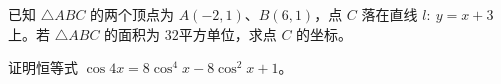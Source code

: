 \documentclass[12pt,a4paper]{exam-zh}
\newcommand{\qscore}[1]{%
    \unskip\nobreak\hfill
    \makebox[0pt][l]{\makebox[4em][r]{(#1\%)}}%
}
\begin{document}

\begin{question}[points = 14]

    \begin{questionparts}
        \item 已知 $\triangle ABC$ 的两个顶点为 $A(-2,1)$、$B(6,1)$，点 $C$ 落在直线 $l:\ y = x + 3$ 上。若 $\triangle ABC$ 的面积为 $32$平方单位，求点 $C$ 的坐标。
        \qscore{5}

        \item 证明恒等式 $\cos 4x = 8\cos^{4}x - 8\cos^{2}x + 1$。 \qscore{5}
    \end{questionparts}
\end{question}
\end{document}
